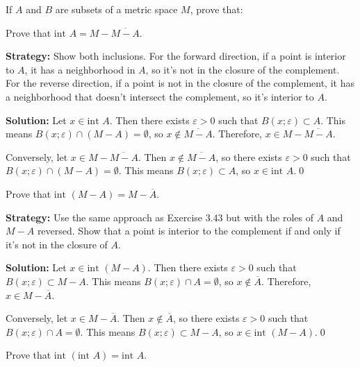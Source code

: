 If $A$ and $B$ are subsets of a metric space $M$, prove that:



\begin{problembox}
Prove that \(\text{int } A = M - \overline{M - A}\).
\end{problembox}

\noindent\textbf{Strategy:} Show both inclusions. For the forward direction, if a point is interior to $A$, it has a neighborhood in $A$, so it's not in the closure of the complement. For the reverse direction, if a point is not in the closure of the complement, it has a neighborhood that doesn't intersect the complement, so it's interior to $A$.

\bigskip\noindent\textbf{Solution:} Let $x \in \text{int } A$. Then there exists $\varepsilon > 0$ such that $B(x;\varepsilon) \subset A$. This means $B(x;\varepsilon) \cap (M - A) = \emptyset$, so $x \notin \overline{M - A}$. Therefore, $x \in M - \overline{M - A}$.

Conversely, let $x \in M - \overline{M - A}$. Then $x \notin \overline{M - A}$, so there exists $\varepsilon > 0$ such that $B(x;\varepsilon) \cap (M - A) = \emptyset$. This means $B(x;\varepsilon) \subset A$, so $x \in \text{int } A$.\qed


\begin{problembox}
Prove that \(\text{int }(M - A) = M - \overline{A}\).
\end{problembox}

\noindent\textbf{Strategy:} Use the same approach as Exercise 3.43 but with the roles of $A$ and $M-A$ reversed. Show that a point is interior to the complement if and only if it's not in the closure of $A$.

\bigskip\noindent\textbf{Solution:} Let $x \in \text{int }(M - A)$. Then there exists $\varepsilon > 0$ such that $B(x;\varepsilon) \subset M - A$. This means $B(x;\varepsilon) \cap A = \emptyset$, so $x \notin \overline{A}$. Therefore, $x \in M - \overline{A}$.

Conversely, let $x \in M - \overline{A}$. Then $x \notin \overline{A}$, so there exists $\varepsilon > 0$ such that $B(x;\varepsilon) \cap A = \emptyset$. This means $B(x;\varepsilon) \subset M - A$, so $x \in \text{int }(M - A)$.\qed


\begin{problembox}
Prove that \(\text{int }(\text{int } A) = \text{int } A\).
\end{problembox}

